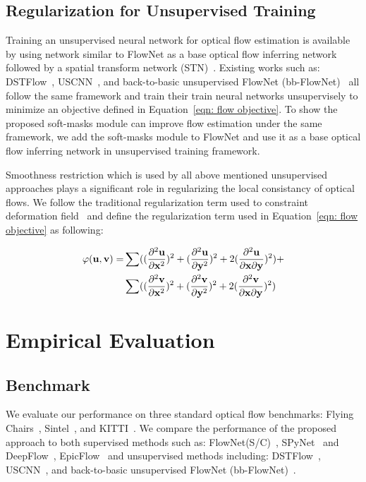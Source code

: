\documentclass[10pt,twocolumn,letterpaper]{article}
\begin{document}
\subsection{Regularization for Unsupervised Training}
Training an unsupervised neural network for optical flow estimation is available by using network similar to FlowNet as a base optical flow inferring network followed by a spatial transform network (STN)~\cite{jaderberg2015spatial}. Existing works such as: DSTFlow~\cite{ren2017unsupervised}, USCNN~\cite{ahmadi2016unsupervised}, and back-to-basic unsupervised FlowNet (bb-FlowNet)~\cite{DBLP:journals/corr/YuHD16} all follow the same framework and train  their train neural networks unsupervisely to minimize an objective defined in Equation~\ref{eqn: flow objective}.  To show the proposed soft-masks module can improve flow estimation under the same framework, we add the soft-masks module to FlowNet and use it as a base optical flow inferring network in unsupervised training framework.

Smoothness restriction which is used by all above mentioned unsupervised approaches plays a significant role in regularizing the local consistancy of optical flows.  We follow the traditional regularization term used to constraint deformation field~\cite{rohlfing2003volume}\cite{ashburner1999nonlinear} and define the regularization term used in Equation~\ref{eqn: flow objective} as following:

\begin{align*}
\varphi(\bold{u}, \bold{v}) = & \sum ((\frac{\partial^2\bold{u}}{\partial \bold{x}^2})^2+(\frac{\partial^2\bold{u}}{\partial \bold{y}^2})^2+2(\frac{\partial^2\bold{u}}{\partial \bold{x} \partial \bold{y}})^2) + \\ 
& \sum ((\frac{\partial^2\bold{v}}{\partial \bold{x}^2})^2+(\frac{\partial^2\bold{v}}{\partial \bold{y}^2})^2+2(\frac{\partial^2\bold{v}}{\partial \bold{x} \partial \bold{y}})^2)
\end{align*}


\section{Empirical Evaluation}
\label{sec: evaluation}
\subsection{Benchmark}
We evaluate our performance on three standard optical flow benchmarks: Flying Chairs~\cite{7410673},  Sintel~\cite{Butler:ECCV:2012}, and KITTI~\cite{geiger2012we}. We compare the performance of the proposed approach to both supervised methods such as: FlowNet(S/C)~\cite{7410673}, SPyNet~\cite{Ranjan_2017_CVPR} and DeepFlow~\cite{weinzaepfel2013deepflow}, EpicFlow~\cite{revaud2015epicflow} and  unsupervised methods including: DSTFlow~\cite{ren2017unsupervised}, USCNN~\cite{ahmadi2016unsupervised}, and back-to-basic unsupervised FlowNet (bb-FlowNet)~\cite{DBLP:journals/corr/YuHD16}. 
\end{document}
